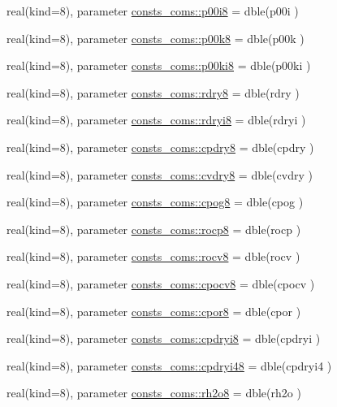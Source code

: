 \begin{DoxyCompactItemize}
\item 
real(kind=8), parameter \hyperlink{namespaceconsts__coms_aced376c2b60cbe3cc01a37de719e2eef}{consts\+\_\+coms\+::p00i8} = dble(p00i )
\item 
real(kind=8), parameter \hyperlink{namespaceconsts__coms_ab098055e26cfe6181b0ca724380c5b30}{consts\+\_\+coms\+::p00k8} = dble(p00k )
\item 
real(kind=8), parameter \hyperlink{namespaceconsts__coms_a3009dbfe507c1ca30000810af3f59930}{consts\+\_\+coms\+::p00ki8} = dble(p00ki )
\item 
real(kind=8), parameter \hyperlink{namespaceconsts__coms_a0614a35b298bde16b9052cb91ecdae5d}{consts\+\_\+coms\+::rdry8} = dble(rdry )
\item 
real(kind=8), parameter \hyperlink{namespaceconsts__coms_a7556798541293b5d2af6de7efad9c79a}{consts\+\_\+coms\+::rdryi8} = dble(rdryi )
\item 
real(kind=8), parameter \hyperlink{namespaceconsts__coms_a2bd3379eb46c1712c4f3d3a4d8cd2725}{consts\+\_\+coms\+::cpdry8} = dble(cpdry )
\item 
real(kind=8), parameter \hyperlink{namespaceconsts__coms_a8c9aee21be43c057704b21f857d05968}{consts\+\_\+coms\+::cvdry8} = dble(cvdry )
\item 
real(kind=8), parameter \hyperlink{namespaceconsts__coms_a9f05c57252e5f7783d8934d0888ac43e}{consts\+\_\+coms\+::cpog8} = dble(cpog )
\item 
real(kind=8), parameter \hyperlink{namespaceconsts__coms_ac4ade9a3b8fe371cd399acb298f58675}{consts\+\_\+coms\+::rocp8} = dble(rocp )
\item 
real(kind=8), parameter \hyperlink{namespaceconsts__coms_a1897d51960a771bcbb6ee081645dcc58}{consts\+\_\+coms\+::rocv8} = dble(rocv )
\item 
real(kind=8), parameter \hyperlink{namespaceconsts__coms_ad09967d9168fbeb34c7fa360442184b5}{consts\+\_\+coms\+::cpocv8} = dble(cpocv )
\item 
real(kind=8), parameter \hyperlink{namespaceconsts__coms_adb9142a68880010b3ef32a291ad3e3d7}{consts\+\_\+coms\+::cpor8} = dble(cpor )
\item 
real(kind=8), parameter \hyperlink{namespaceconsts__coms_ad41aea4d8cdd1fc3ef22d6a0a846ead0}{consts\+\_\+coms\+::cpdryi8} = dble(cpdryi )
\item 
real(kind=8), parameter \hyperlink{namespaceconsts__coms_a1607f8f37a44679745422794546587ce}{consts\+\_\+coms\+::cpdryi48} = dble(cpdryi4 )
\item 
real(kind=8), parameter \hyperlink{namespaceconsts__coms_ad9681369cddf5955b3bac4ce765a6c61}{consts\+\_\+coms\+::rh2o8} = dble(rh2o )

\end{DoxyCompactItemize}
